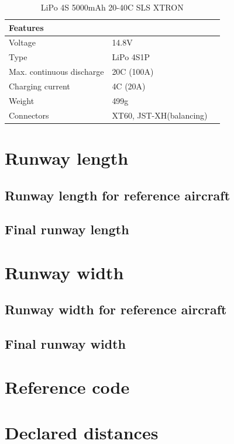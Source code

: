 	
	\begin{table}[htb]
		\centering
		\begin{tabular}{ll p{5cm}}
			\toprule[2pt]
			\textbf{Features} &   \\
			\midrule[1pt]
			Voltage& 14.8V\\
			Type& LiPo 4S1P\\
			Max. continuous discharge & 20C (100A) \\
			Charging current& 4C (20A)\\
			Weight& 499g\\
			Connectors& XT60, JST-XH(balancing)\\
			\bottomrule[2pt]
		\end{tabular}
		\caption{LiPo 4S 5000mAh 20-40C SLS XTRON}
		\label{featuresBattery}
	\end{table}
	
	\section{Runway length}
		\subsection{Runway length for reference aircraft}
		\subsection{Final runway length}
		
	\section{Runway width}
		\subsection{Runway width for reference aircraft}
		\subsection{Final runway width}
		
	\section{Reference code}
	
	\section{Declared distances}
	
